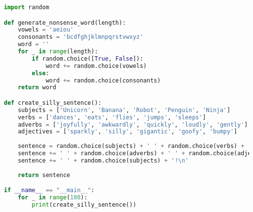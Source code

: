 \documentclass[../../../../main.tex]{subfiles}
\begin{document}













\begin{lstlisting}[language=Python, label={alg:dummycode}, caption={Dummy Code}]
import random

def generate_nonsense_word(length):
    vowels = 'aeiou'
    consonants = 'bcdfghjklmnpqrstvwxyz'
    word = ''
    for _ in range(length):
        if random.choice([True, False]):
            word += random.choice(vowels)
        else:
            word += random.choice(consonants)
    return word

def create_silly_sentence():
    subjects = ['Unicorn', 'Banana', 'Robot', 'Penguin', 'Ninja']
    verbs = ['dances', 'eats', 'flies', 'jumps', 'sleeps']
    adverbs = ['joyfully', 'awkwardly', 'quickly', 'loudly', 'gently']
    adjectives = ['sparkly', 'silly', 'gigantic', 'goofy', 'bumpy']
    
    sentence = random.choice(subjects) + ' ' + random.choice(verbs) + ' ' + generate_nonsense_word(5)
    sentence += ' ' + random.choice(adverbs) + ' ' + random.choice(adjectives) + ' ' + random.choice(verbs)
    sentence += ' ' + random.choice(subjects) + '!\n'
    
    return sentence

if __name__ == "__main__":
    for _ in range(100):
        print(create_silly_sentence())

\end{lstlisting}
\end{document}
